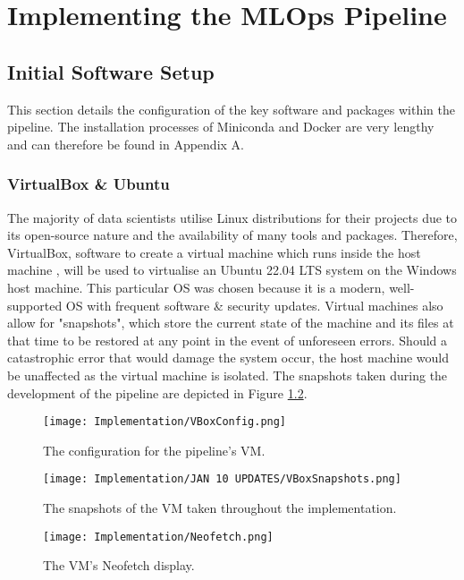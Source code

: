 \chapter{Implementing the MLOps Pipeline}

\section{Initial Software Setup}
This section details the configuration of the key software and packages within the pipeline. The installation 
processes of Miniconda and Docker are very lengthy and can therefore be found in Appendix A.

\subsection{VirtualBox \& Ubuntu}
The majority of data scientists utilise Linux distributions for their projects due to its open-source nature and the 
availability of many tools and packages. Therefore, VirtualBox, software to create a virtual machine which runs inside the host 
machine \autocite{oracle_oracle_nodate}, will be used to virtualise an Ubuntu 22.04 LTS system on the Windows host machine. This 
particular OS was chosen because it is a modern, well-supported OS with frequent software \& security updates. Virtual machines
also allow for "snapshots", which store the current state of the machine and its files at that time to be restored at any point in the 
event of unforeseen errors. Should a catastrophic error that would damage the system occur, the host machine would be unaffected as the 
virtual machine is isolated. The snapshots taken during the development of the pipeline are depicted in Figure \ref{fig:VBoxSnapshots}.

\begin{figure}[H]
    \centering
    \texttt{[image: Implementation/VBoxConfig.png]}
    \caption{The configuration for the pipeline's VM.}
    \label{fig:VBoxConfig}
\end{figure}

\begin{figure}[H]
    \centering
    \texttt{[image: Implementation/JAN 10 UPDATES/VBoxSnapshots.png]}
    \caption{The snapshots of the VM taken throughout the implementation.}
    \label{fig:VBoxSnapshots}
\end{figure}

\begin{figure}[H]
    \centering
    \texttt{[image: Implementation/Neofetch.png]}
    \caption{The VM's Neofetch display.}
    \label{fig:Neofetch}
\end{figure}

